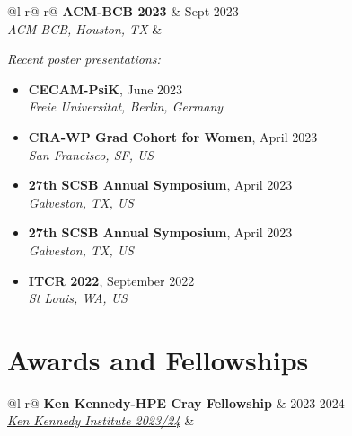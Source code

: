\documentclass[a4paper,12pt]{article}
\begin{document}
\begin{tabularx}{\linewidth}{ @{}l r@{} r@{} }
\textbf{ACM-BCB 2023} & \hfill Sept 2023 \\
\textit{ACM-BCB, Houston, TX} & \\[3.75pt]
\end{tabularx}

\textit{Recent poster presentations:}


\begin{itemize}
    \item \textbf{CECAM-PsiK}, June 2023 \\
    \textit{Freie Universitat, Berlin, Germany}
    \item \textbf{CRA-WP Grad Cohort for Women}, April 2023 \\
    \textit{San Francisco, SF, US}
    \item \textbf{27th SCSB Annual Symposium}, April 2023 \\
    \textit{Galveston, TX, US}
    \item \textbf{27th SCSB Annual Symposium}, April 2023 \\
    \textit{Galveston, TX, US}
    \item \textbf{ITCR 2022}, September 2022 \\
    \textit{St Louis, WA, US}
\end{itemize}



\section{Awards and Fellowships}

\begin{tabularx}{\linewidth}{ @{}l r@{} }
\textbf{Ken Kennedy-HPE Cray Fellowship} & \hfill 2023-2024 \\
\textit{\href{https://kenkennedy.rice.edu/news/current-news/ken-kennedy-institute-sponsored-graduate-fellowship-program-awards-65000-nine}{Ken Kennedy Institute 2023/24}} & \\[3.75pt]
\end{tabularx}
\end{document}
